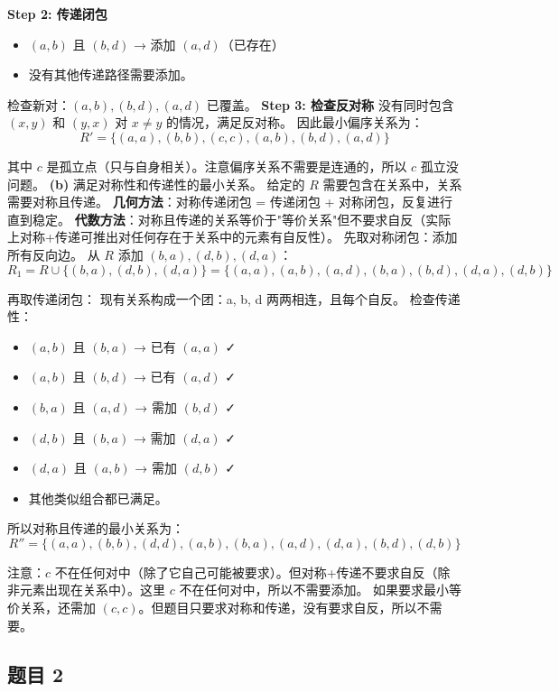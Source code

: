 \documentclass[10pt,a4paper,openany]{ctexbook}
\theoremstyle{definition}
\theoremstyle{remark}
\begin{document}
\textbf{Step 2: 传递闭包}
\begin{itemize}
\item $(a,b)$ 且 $(b,d)$ → 添加 $(a,d)$（已存在）
\item 没有其他传递路径需要添加。

\end{itemize}

检查新对：$(a,b), (b,d), (a,d)$ 已覆盖。
\textbf{Step 3: 检查反对称}
没有同时包含 $(x,y)$ 和 $(y,x)$ 对 $x \neq y$ 的情况，满足反对称。
因此最小偏序关系为：
\[
R' = \{(a,a), (b,b), (c,c), (a,b), (b,d), (a,d)\}
\]

其中 $c$ 是孤立点（只与自身相关）。注意偏序关系不需要是连通的，所以 $c$ 孤立没问题。
\textbf{(b)} 满足对称性和传递性的最小关系。
给定的 $R$ 需要包含在关系中，关系需要对称且传递。
\textbf{几何方法}：对称传递闭包 = 传递闭包 + 对称闭包，反复进行直到稳定。
\textbf{代数方法}：对称且传递的关系等价于"等价关系"但不要求自反（实际上对称+传递可推出对任何存在于关系中的元素有自反性）。
先取对称闭包：添加所有反向边。
从 $R$ 添加 $(b,a), (d,b), (d,a)$：
\[
R_1 = R \cup \{(b,a), (d,b), (d,a)\} = \{(a,a), (a,b), (a,d), (b,a), (b,d), (d,a), (d,b)\}
\]

再取传递闭包：
现有关系构成一个团：a, b, d 两两相连，且每个自反。
检查传递性：
\begin{itemize}
\item $(a,b)$ 且 $(b,a)$ → 已有 $(a,a)$ ✓
\item $(a,b)$ 且 $(b,d)$ → 已有 $(a,d)$ ✓
\item $(b,a)$ 且 $(a,d)$ → 需加 $(b,d)$ ✓
\item $(d,b)$ 且 $(b,a)$ → 需加 $(d,a)$ ✓
\item $(d,a)$ 且 $(a,b)$ → 需加 $(d,b)$ ✓
\item 其他类似组合都已满足。

\end{itemize}

所以对称且传递的最小关系为：
\[
R'' = \{(a,a), (b,b), (d,d), (a,b), (b,a), (a,d), (d,a), (b,d), (d,b)\}
\]

注意：$c$ 不在任何对中（除了它自己可能被要求）。但对称+传递不要求自反（除非元素出现在关系中）。这里 $c$ 不在任何对中，所以不需要添加。
如果要求最小等价关系，还需加 $(c,c)$。但题目只要求对称和传递，没有要求自反，所以不需要。
\vspace{-2pt}

\subsection{题目 2}
\end{document}

